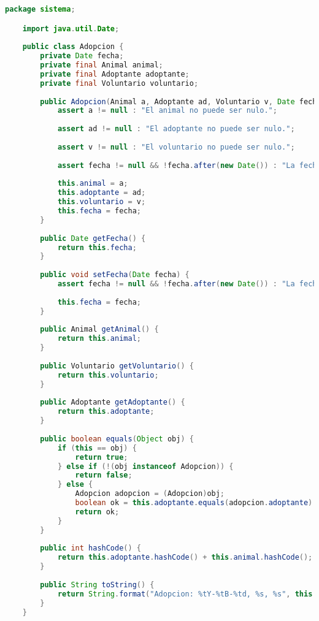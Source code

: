 \begin{lstlisting}[style = javaNormal, language=Java] 
    package sistema;

    import java.util.Date;
    
    public class Adopcion {
        private Date fecha;
        private final Animal animal;
        private final Adoptante adoptante;
        private final Voluntario voluntario;
    
        public Adopcion(Animal a, Adoptante ad, Voluntario v, Date fecha) {
            assert a != null : "El animal no puede ser nulo.";
    
            assert ad != null : "El adoptante no puede ser nulo.";
    
            assert v != null : "El voluntario no puede ser nulo.";
    
            assert fecha != null && !fecha.after(new Date()) : "La fecha no puede ser nula ni estar en el futuro.";
    
            this.animal = a;
            this.adoptante = ad;
            this.voluntario = v;
            this.fecha = fecha;
        }
    
        public Date getFecha() {
            return this.fecha;
        }
    
        public void setFecha(Date fecha) {
            assert fecha != null && !fecha.after(new Date()) : "La fecha no puede ser nula ni estar en el futuro";
    
            this.fecha = fecha;
        }
    
        public Animal getAnimal() {
            return this.animal;
        }
    
        public Voluntario getVoluntario() {
            return this.voluntario;
        }
    
        public Adoptante getAdoptante() {
            return this.adoptante;
        }
    
        public boolean equals(Object obj) {
            if (this == obj) {
                return true;
            } else if (!(obj instanceof Adopcion)) {
                return false;
            } else {
                Adopcion adopcion = (Adopcion)obj;
                boolean ok = this.adoptante.equals(adopcion.adoptante) && this.animal.equals(adopcion.animal);
                return ok;
            }
        }
    
        public int hashCode() {
            return this.adoptante.hashCode() + this.animal.hashCode();
        }
    
        public String toString() {
            return String.format("Adopcion: %tY-%tB-%td, %s, %s", this.fecha, this.fecha, this.fecha, this.animal, this.adoptante);
        }
    }
    
\end{lstlisting}



